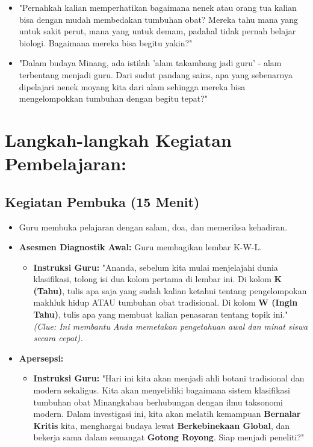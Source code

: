 \documentclass[a4paper,12pt]{article}
\begin{document}
\begin{itemize}
\item "Pernahkah kalian memperhatikan bagaimana nenek atau orang tua kalian bisa dengan mudah membedakan tumbuhan obat? Mereka tahu mana yang untuk sakit perut, mana yang untuk demam, padahal tidak pernah belajar biologi. Bagaimana mereka bisa begitu yakin?"
\item "Dalam budaya Minang, ada istilah 'alam takambang jadi guru' - alam terbentang menjadi guru. Dari sudut pandang sains, apa yang sebenarnya dipelajari nenek moyang kita dari alam sehingga mereka bisa mengelompokkan tumbuhan dengan begitu tepat?"
\end{itemize}

\section{Langkah-langkah Kegiatan Pembelajaran:}

\subsection{Kegiatan Pembuka (15 Menit)}
\begin{itemize}
\item Guru membuka pelajaran dengan salam, doa, dan memeriksa kehadiran.
\item \textbf{Asesmen Diagnostik Awal:} Guru membagikan lembar K-W-L.
    \begin{itemize}
    \item \textbf{Instruksi Guru:} "Ananda, sebelum kita mulai menjelajahi dunia klasifikasi, tolong isi dua kolom pertama di lembar ini. Di kolom \textbf{K (Tahu)}, tulis apa saja yang sudah kalian ketahui tentang pengelompokan makhluk hidup ATAU tumbuhan obat tradisional. Di kolom \textbf{W (Ingin Tahu)}, tulis apa yang membuat kalian penasaran tentang topik ini." \textit{(Clue: Ini membantu Anda memetakan pengetahuan awal dan minat siswa secara cepat).}
    \end{itemize}
\item \textbf{Apersepsi:}
    \begin{itemize}
    \item \textbf{Instruksi Guru:} "Hari ini kita akan menjadi ahli botani tradisional dan modern sekaligus. Kita akan menyelidiki bagaimana sistem klasifikasi tumbuhan obat Minangkabau berhubungan dengan ilmu taksonomi modern. Dalam investigasi ini, kita akan melatih kemampuan \textbf{Bernalar Kritis} kita, menghargai budaya lewat \textbf{Berkebinekaan Global}, dan bekerja sama dalam semangat \textbf{Gotong Royong}. Siap menjadi peneliti?"
    \end{itemize}
\end{itemize}
\end{document}

